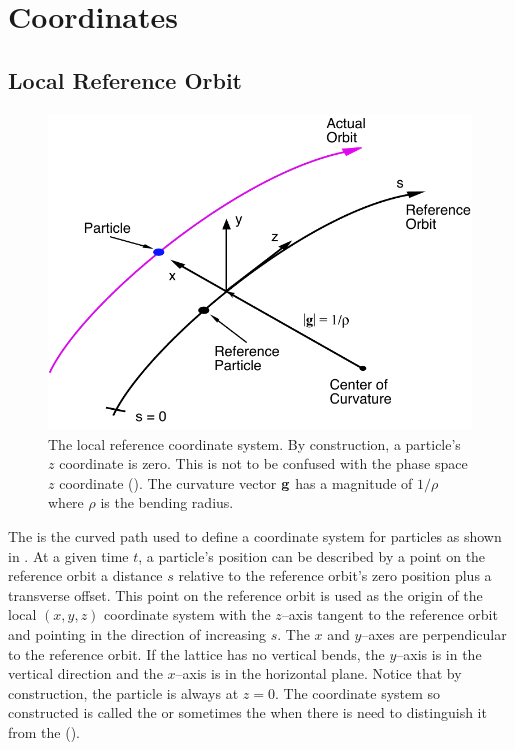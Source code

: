 %


\chapter{Coordinates}

\section{Local Reference Orbit}
\label{s:ref}


\begin{figure}[!b]
  \centering
  \includegraphics[height=8.4cm]{local-coords.pdf}
  \caption[The Local Reference System.]
{The local reference coordinate system. By construction, a
particle's $z$ coordinate is zero.  This is not to be confused with
the phase space $z$ coordinate ().  The curvature
vector ${\bf g}$ has a magnitude of $1/\rho$ where $\rho$ is the bending
radius.}
  \label{f:local.coords}
\end{figure}

The  is the curved path used to define a
coordinate system for particles as shown in
. At a given time $t$, a particle's
position can be described by a point on the reference orbit a distance
$s$ relative to the reference orbit's zero position plus a transverse
offset. This point on the reference orbit is used as the origin of the
local $(x, y, z)$ coordinate system with the $z$--axis tangent to the
reference orbit and pointing in the direction of increasing $s$. The
$x$ and $y$--axes are perpendicular to the reference orbit. If the
lattice has no vertical bends, the $y$--axis is in the vertical
direction and the $x$--axis is in the horizontal plane. Notice that by
construction, the particle is always at $z = 0$. The coordinate system
so constructed is called the  or sometimes
the  when there is need to
distinguish it from the 
().

